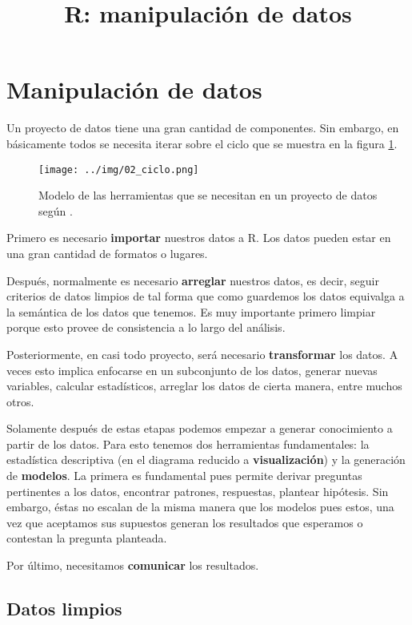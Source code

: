 \documentclass[]{article}
\title{R: manipulación de datos}
\author{}
\date{}
\begin{document}
\section{Manipulación de datos}\label{manipulacion-de-datos}

Un proyecto de datos tiene una gran cantidad de componentes. Sin
embargo, en básicamente todos se necesita iterar sobre el ciclo que se
muestra en la figura \ref{fig:ciclo}.

\begin{figure}[h]
    \centering
    \texttt{[image: ../img/02\_ciclo.png]}
    \caption{Modelo de las herramientas que se necesitan en un proyecto de datos según \textcite[Introducción]{grolemund2016r}.}
    \label{fig:ciclo}
\end{figure}

Primero es necesario \textbf{importar} nuestros datos a R. Los datos
pueden estar en una gran cantidad de formatos o lugares.

Después, normalmente es necesario \textbf{arreglar} nuestros datos, es
decir, seguir criterios de datos limpios de tal forma que como guardemos
los datos equivalga a la semántica de los datos que tenemos. Es muy
importante primero limpiar porque esto provee de consistencia a lo largo
del análisis.

Posteriormente, en casi todo proyecto, será necesario
\textbf{transformar} los datos. A veces esto implica enfocarse en un
subconjunto de los datos, generar nuevas variables, calcular
estadísticos, arreglar los datos de cierta manera, entre muchos otros.

Solamente después de estas etapas podemos empezar a generar conocimiento
a partir de los datos. Para esto tenemos dos herramientas fundamentales:
la estadística descriptiva (en el diagrama reducido a
\textbf{visualización}) y la generación de \textbf{modelos}. La primera
es fundamental pues permite derivar preguntas pertinentes a los datos,
encontrar patrones, respuestas, plantear hipótesis. Sin embargo, éstas
no escalan de la misma manera que los modelos pues estos, una vez que
aceptamos sus supuestos generan los resultados que esperamos o contestan
la pregunta planteada.

Por último, necesitamos \textbf{comunicar} los resultados.

\subsection{Datos limpios}\label{datos-limpios}
\end{document}
